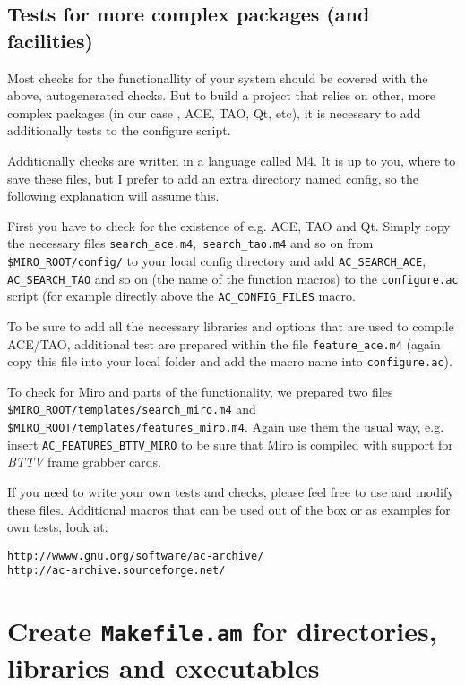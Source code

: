 \subsection{Tests for more complex packages (and facilities)}

Most checks for the functionallity of your system should be covered
with the above, autogenerated checks. But to build a project that
relies on other, more complex packages (in our case \miro, ACE, TAO,
Qt, etc), it is necessary to add additionally tests to the configure
script.

Additionally checks are written in a language called M4. It is up to
you, where to save these files, but I prefer to add an extra directory
named config, so the following explanation will assume this.

First you have to check for the existence of e.g. ACE, TAO and
Qt. Simply copy the necessary files {\tt search\_ace.m4},{\tt
search\_tao.m4} and so on from {\tt \$MIRO\_ROOT/\-config/} to your local
config directory and add {\tt AC\_SEARCH\_ACE}, {\tt AC\_SEARCH\_TAO} and
so on (the name of the function macros) to the {\tt configure.ac}
script (for example directly above the {\tt AC\_CONFIG\_FILES} macro.

To be sure to add all the necessary libraries and options that are
used to compile ACE/\-TAO, additional test are prepared within the file
{\tt feature\_ace.m4} (again copy this file into your local folder and
add the macro name into {\tt configure.ac}).

To check for Miro and parts of the functionality, we prepared two
files {\tt \$MIRO\_ROOT/\-templates/\-search\_miro.m4} and {\tt
\$MIRO\_ROOT/\-templates/\-features\_miro.m4}. Again use them the usual way,
e.g. insert {\tt AC\_FEATURES\_BTTV\_MIRO} to be sure that Miro is
compiled with support for {\em BTTV\/} frame grabber cards.

If you need to write your own tests and checks, please feel free to
use and modify these files. Additional macros that can be used out of
the box or as examples for own tests, look at:

\begin{verbatim}
http://wwww.gnu.org/software/ac-archive/
http://ac-archive.sourceforge.net/
\end{verbatim}

\section{Create {\tt Makefile.am} for directories, libraries and executables}

